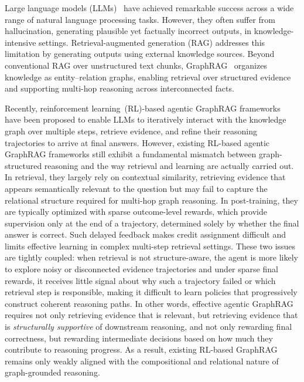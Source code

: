 Large language models (LLMs)~\citep{qwen2025qwen25technicalreport,guo2025deepseek,comanici2025gemini} have achieved remarkable success across a wide range of natural language processing tasks.
However, they often suffer from hallucination, generating plausible yet factually incorrect outputs, in knowledge-intensive settings.
Retrieval-augmented generation (RAG) addresses this limitation by generating outputs using external knowledge sources.
Beyond conventional RAG over unstructured text chunks, GraphRAG~\citep{luo2025graph,sun2023thinkongraph,luo2025hypergraphrag} organizes knowledge as entity--relation graphs, enabling retrieval over structured evidence and supporting multi-hop reasoning across interconnected facts.

Recently, reinforcement learning~(RL)-based agentic GraphRAG frameworks~\citep{luo2025graph} have been proposed to enable LLMs to iteratively interact with the knowledge graph over multiple steps, retrieve evidence, and refine their reasoning trajectories to arrive at final answers.
However, existing RL-based agentic GraphRAG frameworks still exhibit a fundamental mismatch between graph-structured reasoning and the way retrieval and learning are actually carried out.
In retrieval, they largely rely on contextual similarity, retrieving evidence that appears semantically relevant to the question but may fail to capture the relational structure required for multi-hop graph reasoning.
In post-training, they are typically optimized with sparse outcome-level rewards, which provide supervision only at the end of a trajectory, determined solely by whether the final answer is correct.
Such delayed feedback makes credit assignment difficult and limits effective learning in complex multi-step retrieval settings.
These two issues are tightly coupled: when retrieval is not structure-aware, the agent is more likely to explore noisy or disconnected evidence trajectories and under sparse final rewards, it receives little signal about why such a trajectory failed or which retrieval step is responsible, making it difficult to learn policies that progressively construct coherent reasoning paths. 
In other words, effective agentic GraphRAG requires not only retrieving evidence that is relevant, but retrieving evidence that is \emph{structurally supportive} of downstream reasoning, and not only rewarding final correctness, but rewarding intermediate decisions based on how much they contribute to reasoning progress.
As a result, existing RL-based GraphRAG remains only weakly aligned with the compositional and relational nature of graph-grounded reasoning.


